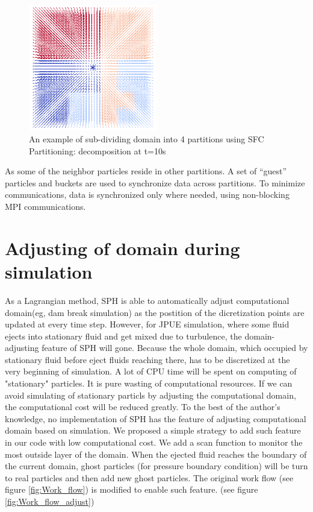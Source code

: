 \documentclass[10pt,a4paper]{article}
\begin{document}
\begin{figure}[h]
\caption{An example of sub-dividing domain into 4 partitions using SFC Partitioning: decomposition at t=10s}
\centering
\label{fig:t10_domain_decomposition}
\includegraphics[width=0.5\textwidth]{t10_domain_decomposition}
\end{figure}
As some of the neighbor particles reside in other
partitions. A set of “guest” particles and buckets are used to synchronize data across partitions. To minimize communications, data is synchronized only where needed, using non-blocking MPI communications. 
\section{Adjusting of domain during simulation}
As a Lagrangian method, SPH is able to automatically adjust computational domain(eg, dam break simulation) as the postition of the dicretization points are updated at every time step. However, for JPUE simulation, where some fluid ejects into stationary fluid and get mixed due to turbulence, the domain-adjusting feature of SPH will gone. Because the whole domain, which occupied by stationary fluid before eject fluids reaching there, has to be discretized at the very beginning of simulation. A lot of CPU time will be spent on computing of "stationary" particles. It is pure wasting of computational resources. If we can avoid simulating of stationary particls by adjusting the computational domain, the computational cost will be reduced greatly. To the best of the author's knowledge, no implementation of SPH has the feature of adjusting computational domain based on simulation. We proposed a simple strategy to add such feature in our code with low computational cost. We add a scan function to monitor the most outside layer of the domain. When the ejected fluid reaches the boundary of the current domain,  ghost particles (for pressure boundary condition) will be turn to real particles and then add new ghost particles. The original work flow (see figure \ref{fig:Work_flow}) is modified to enable such feature. (see figure \ref{fig:Work_flow_adjust})
\end{document}
